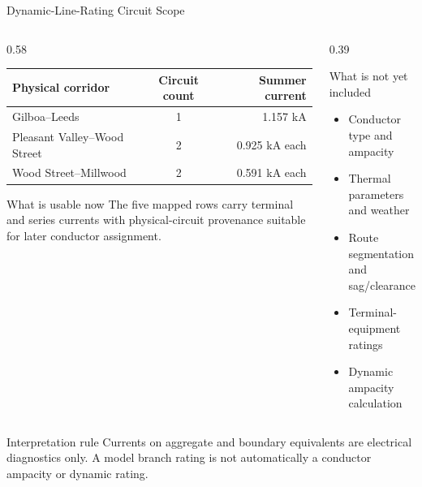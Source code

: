 \documentclass[aspectratio=169,10pt]{beamer}
\begin{document}
\begin{frame}{Dynamic-Line-Rating Circuit Scope}
\begin{columns}[T,onlytextwidth]
\begin{column}{0.58\linewidth}
\scriptsize
\begin{tabularx}{\linewidth}{X c r}
\toprule
Physical corridor & Circuit count & Summer current \\
\midrule
Gilboa--Leeds & 1 & 1.157 kA \\
Pleasant Valley--Wood Street & 2 & 0.925 kA each \\
Wood Street--Millwood & 2 & 0.591 kA each \\
\bottomrule
\end{tabularx}

\vspace{0.65em}
\begin{exampleblock}{What is usable now}
The five mapped rows carry terminal and series currents with physical-circuit provenance suitable for later conductor assignment.
\end{exampleblock}
\end{column}
\begin{column}{0.39\linewidth}
\begin{alertblock}{What is not yet included}
\begin{itemize}
  \item Conductor type and ampacity
  \item Thermal parameters and weather
  \item Route segmentation and sag/clearance
  \item Terminal-equipment ratings
  \item Dynamic ampacity calculation
\end{itemize}
\end{alertblock}
\end{column}
\end{columns}

\begin{block}{Interpretation rule}
Currents on aggregate and boundary equivalents are electrical diagnostics only. A model branch rating is not automatically a conductor ampacity or dynamic rating.
\end{block}
\end{frame}
\end{document}
